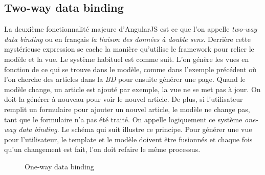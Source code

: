 \documentclass[letterpaper,10pt,oneside]{sphinxmanual}
\begin{document}
\subsection{Two-way data binding}
\label{angularjs:two-way-data-binding}
La deuxième fonctionnalité majeure d'AngularJS est ce que l'on appelle \emph{two-way data binding} ou en français \emph{la liaison des données à double sens}. Derrière cette mystérieuse expression se cache la manière qu'utilise le framework pour relier le modèle et la vue. Le système habituel est comme suit. L'on génère les vues en fonction de ce qui se trouve dans le modèle, comme dans l'exemple précédent où l'on cherche des articles dans la \emph{BD} pour ensuite générer une page. Quand le modèle change, un article est ajouté par exemple, la vue ne se met pas à jour. On doit la générer à nouveau pour voir le nouvel article. De plus, si l'utilisateur remplit un formulaire pour ajouter un nouvel article, le modèle ne change pas, tant que le formulaire n'a pas été traité. On appelle logiquement ce système \emph{one-way data binding}. Le schéma qui suit illustre ce principe. Pour générer une vue pour l'utilisateur, le template et le modèle doivent être fusionnés et chaque fois qu'un changement est fait, l'on doit refaire le même processus.
\begin{figure}[htbp]
\centering
\capstart

\caption{One-way data binding}\end{figure}
\end{document}

